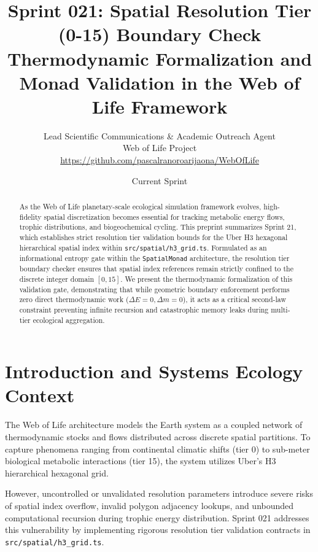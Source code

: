 \documentclass[11pt, a4paper]{article}
\title{\textbf{Sprint 021: Spatial Resolution Tier (0-15) Boundary Check \\ \large Thermodynamic Formalization and Monad Validation in the Web of Life Framework}}
\author{Lead Scientific Communications \& Academic Outreach Agent \\ Web of Life Project \\ \url{https://github.com/pascalranoroarijaona/WebOfLife}}
\date{Current Sprint}
\begin{document}
\maketitle

\begin{abstract}
As the Web of Life planetary-scale ecological simulation framework evolves, high-fidelity spatial discretization becomes essential for tracking metabolic energy flows, trophic distributions, and biogeochemical cycling. This preprint summarizes Sprint 21, which establishes strict resolution tier validation bounds for the Uber H3 hexagonal hierarchical spatial index within \texttt{src/spatial/h3\_grid.ts}. Formulated as an informational entropy gate within the \texttt{SpatialMonad} architecture, the resolution tier boundary checker ensures that spatial index references remain strictly confined to the discrete integer domain $[0, 15]$. We present the thermodynamic formalization of this validation gate, demonstrating that while geometric boundary enforcement performs zero direct thermodynamic work ($\Delta E = 0, \Delta m = 0$), it acts as a critical second-law constraint preventing infinite recursion and catastrophic memory leaks during multi-tier ecological aggregation.
\end{abstract}

\section{Introduction and Systems Ecology Context}
The Web of Life architecture models the Earth system as a coupled network of thermodynamic stocks and flows distributed across discrete spatial partitions. To capture phenomena ranging from continental climatic shifts (tier 0) to sub-meter biological metabolic interactions (tier 15), the system utilizes Uber's H3 hierarchical hexagonal grid. 

However, uncontrolled or unvalidated resolution parameters introduce severe risks of spatial index overflow, invalid polygon adjacency lookups, and unbounded computational recursion during trophic energy distribution. Sprint 021 addresses this vulnerability by implementing rigorous resolution tier validation contracts in \texttt{src/spatial/h3\_grid.ts}.
\end{document}
